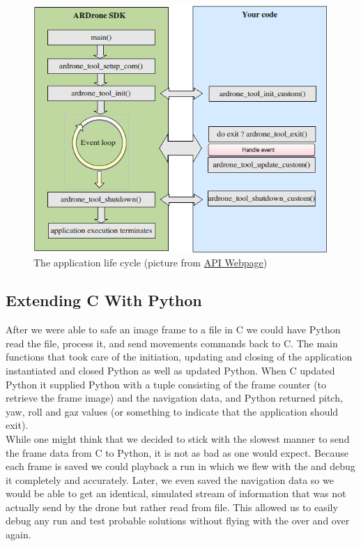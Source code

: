 \begin{figure}[h!]
    \centering
        \includegraphics[scale=0.6]{mainloop.png}
    \caption{The application life cycle (picture from \href{https://projects.ardrone.org/embedded/ardrone-api/index.html}{\Ardrone API Webpage})}
    \label{mainloop}
\end{figure}

\subsection{Extending C With Python}
After we were able to safe an image frame to a file in C we could have Python read the file, process it, and send movements commands back to C. The main functions 
that took care of the initiation, updating and closing of the application instantiated and closed Python as well as updated Python. When C updated Python it supplied
Python with a tuple consisting of the frame counter (to retrieve the frame image) and the navigation data, and Python returned pitch, yaw, roll and gaz values (or something
to indicate that the application should exit). \\

While one might think that we decided to stick with the slowest manner to send the frame data from C to Python, it is not as bad as one would expect. Because each frame is
saved we could playback a run in which we flew with the \Ardrone and debug it completely and accurately. Later, we even saved the navigation data so we would be able to 
get an identical, simulated stream of information that was not actually send by the drone but rather read from file. This allowed us to easily debug any run and test 
probable solutions without flying with the \Ardrone over and over again. \\

